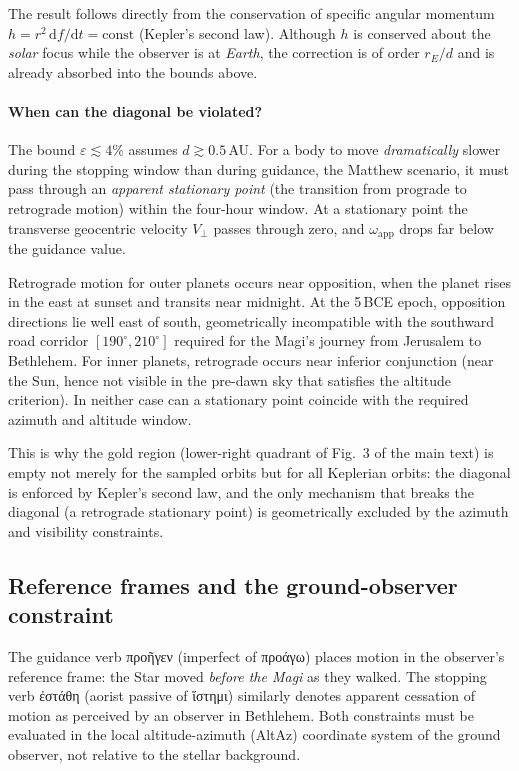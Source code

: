 \documentclass[11pt,a4paper]{article}
\newcommand{\grk}[1]{{\fontencoding{LGR}\selectfont #1}}
\newcommand{\grk}[1]{{\greekfont #1}}
\begin{document}
The result follows directly from the conservation of specific angular
momentum $h = r^2\,\mathrm{d}f/\mathrm{d}t = \mathrm{const}$ (Kepler's
second law). Although $h$ is conserved about the \emph{solar} focus while the
observer is at \emph{Earth}, the correction is of order $r_E/d$ and is already
absorbed into the bounds above.

\paragraph{When can the diagonal be violated?}
The bound $\varepsilon \lesssim 4\%$ assumes $d \gtrsim 0.5$\,AU.
For a body to move \emph{dramatically} slower during the stopping window
than during guidance, the Matthew scenario, it must pass through an
\emph{apparent stationary point} (the transition from prograde to retrograde
motion) within the four-hour window. At a stationary point the transverse
geocentric velocity $V_\perp$ passes through zero, and $\omega_\mathrm{app}$
drops far below the guidance value.

Retrograde motion for outer planets occurs near opposition, when the planet
rises in the east at sunset and transits near midnight. At the 5\,BCE epoch,
opposition directions lie well east of south, geometrically incompatible with
the southward road corridor $[190^\circ,210^\circ]$ required for the Magi's
journey from Jerusalem to Bethlehem. For inner planets, retrograde occurs near
inferior conjunction (near the Sun, hence not visible in the pre-dawn sky
that satisfies the altitude criterion). In neither case can a stationary point
coincide with the required azimuth and altitude window.

This is why the gold region (lower-right quadrant of Fig.~3 of the main text) is empty not
merely for the sampled orbits but for all Keplerian orbits: the diagonal is
enforced by Kepler's second law, and the only mechanism that breaks the
diagonal (a retrograde stationary point) is geometrically excluded by the
azimuth and visibility constraints.

\subsection{Reference frames and the ground-observer constraint}
\label{subsec:refframes}

The guidance verb \grk{προῆγεν} (imperfect of \grk{προάγω}) places motion in the
observer's reference frame: the Star moved \emph{before the Magi} as they walked.
The stopping verb \grk{ἐστάθη} (aorist passive of \grk{ἵστημι}) similarly denotes
apparent cessation of motion as perceived by an observer in Bethlehem. Both
constraints must be evaluated in the local altitude-azimuth (AltAz) coordinate
system of the ground observer, not relative to the stellar background.
\end{document}
